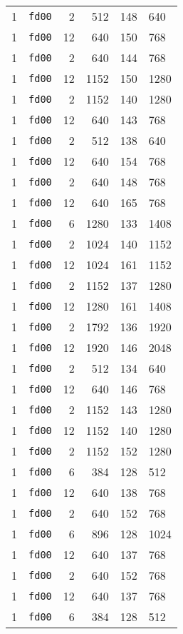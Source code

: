 \documentclass{article}
\begin{document}
\begin{table}[h!]
\begin{tabular}{llrrrl}
    1 & \texttt{fd00} & 2 & 512 & 148 & 640 \\
    1 & \texttt{fd00} & 12 & 640 & 150 & 768 \\
    1 & \texttt{fd00} & 2 & 640 & 144 & 768 \\
    1 & \texttt{fd00} & 12 & 1152 & 150 & 1280 \\
    1 & \texttt{fd00} & 2 & 1152 & 140 & 1280 \\
    1 & \texttt{fd00} & 12 & 640 & 143 & 768 \\
    1 & \texttt{fd00} & 2 & 512 & 138 & 640 \\
    1 & \texttt{fd00} & 12 & 640 & 154 & 768 \\
    1 & \texttt{fd00} & 2 & 640 & 148 & 768 \\
    1 & \texttt{fd00} & 12 & 640 & 165 & 768 \\
    1 & \texttt{fd00} & 6 & 1280 & 133 & 1408 \\
    1 & \texttt{fd00} & 2 & 1024 & 140 & 1152 \\
    1 & \texttt{fd00} & 12 & 1024 & 161 & 1152 \\
    1 & \texttt{fd00} & 2 & 1152 & 137 & 1280 \\
    1 & \texttt{fd00} & 12 & 1280 & 161 & 1408 \\
    1 & \texttt{fd00} & 2 & 1792 & 136 & 1920 \\
    1 & \texttt{fd00} & 12 & 1920 & 146 & 2048 \\
    1 & \texttt{fd00} & 2 & 512 & 134 & 640 \\
    1 & \texttt{fd00} & 12 & 640 & 146 & 768 \\
    1 & \texttt{fd00} & 2 & 1152 & 143 & 1280 \\
    1 & \texttt{fd00} & 12 & 1152 & 140 & 1280 \\
    1 & \texttt{fd00} & 2 & 1152 & 152 & 1280 \\
    1 & \texttt{fd00} & 6 & 384 & 128 & 512 \\
    1 & \texttt{fd00} & 12 & 640 & 138 & 768 \\
    1 & \texttt{fd00} & 2 & 640 & 152 & 768 \\
    1 & \texttt{fd00} & 6 & 896 & 128 & 1024 \\
    1 & \texttt{fd00} & 12 & 640 & 137 & 768 \\
    1 & \texttt{fd00} & 2 & 640 & 152 & 768 \\
    1 & \texttt{fd00} & 12 & 640 & 137 & 768 \\
    1 & \texttt{fd00} & 6 & 384 & 128 & 512 \\

\end{tabular}
\end{table}
\end{document}
